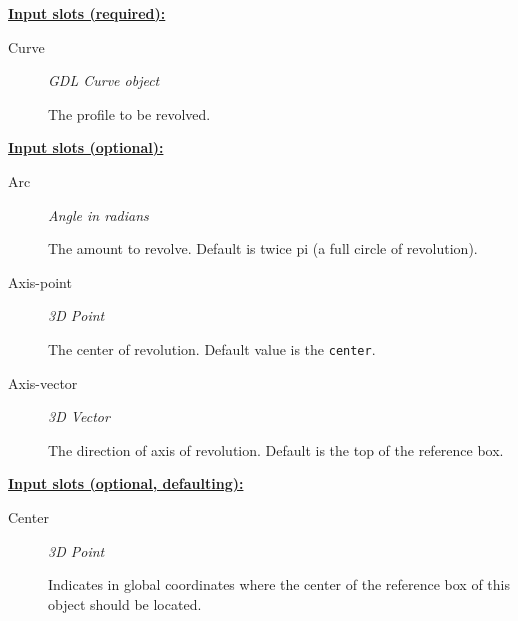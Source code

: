 \documentclass [11pt]{book}
\begin{document}
\begin{itemize}
\textbf{
\underline{Input slots (required):}}

\begin{description}

\item [Curve]
\emph{GDL Curve object}

 The profile to be revolved.




\end{description}






\textbf{
\underline{Input slots (optional):}}

\begin{description}

\item [Arc]
\emph{Angle in radians}

 The amount to revolve. Default is twice pi (a full circle of revolution).




\item [Axis-point]
\emph{3D Point}

 The center of revolution. Default value is the \texttt{center}.




\item [Axis-vector]
\emph{3D Vector}

 The direction of axis of revolution. Default is the top of the reference box.




\end{description}






\textbf{
\underline{Input slots (optional, defaulting):}}

\begin{description}

\item [Center]
\emph{3D Point}

 Indicates in global coordinates where the center of the reference
box of this object should be located.




\end{description}








\end{itemize}
\end{document}
